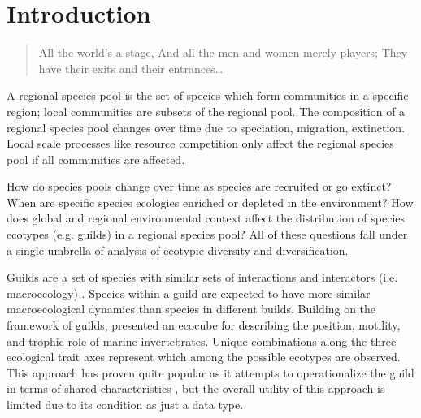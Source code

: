 \documentclass[12pt,letterpaper]{article}
\begin{document}
\section*{Introduction}

\begin{quotation}
  All the world's a stage, And all the men and women merely players; They have their exits and their entrances\dots
\end{quotation}


A regional species pool is the set of species which form communities in a specific region; local communities are subsets of the regional pool. The composition of a regional species pool changes over time due to speciation, migration, extinction. Local scale processes like resource competition only affect the regional species pool if all communities are affected.

How do species pools change over time as species are recruited or go extinct? When are specific species ecologies enriched or depleted in the environment? How does global and regional environmental context affect the distribution of species ecotypes (e.g. guilds) in a regional species pool? All of these questions fall under a single umbrella of analysis of ecotypic diversity and diversification.

Guilds are a set of species with similar sets of interactions and interactors (i.e. macroecology) \citep{Valentine1969,Bambach1977}. Species within a guild are expected to have more similar macroecological dynamics than species in different builds. Building on the framework of guilds, \citep{Bush2007} presented an ecocube for describing the position, motility, and trophic role of marine invertebrates. Unique combinations along the three ecological trait axes represent which among the possible ecotypes are observed. This approach has proven quite popular as it attempts to operationalize the guild in terms of shared characteristics \citep{Bush2007,Bambach2007,Bush2011}, but the overall utility of this approach is limited due to its condition as just a data type.
\end{document}
